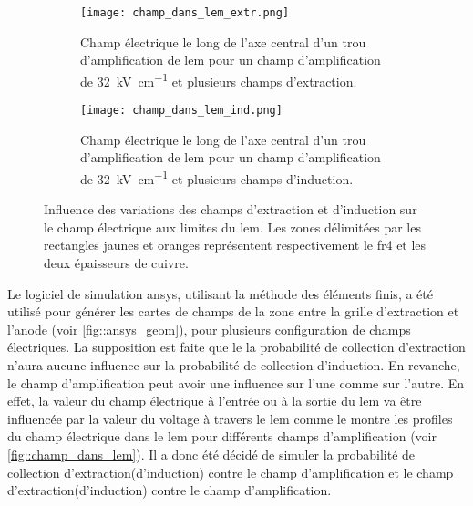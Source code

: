             \begin{figure}[htpb]
                \begin{subfigure}[t]{0.48\textwidth}
                    \texttt{[image: champ\_dans\_lem\_extr.png]}
                    \caption{Champ électrique le long de l'axe central d'un trou d'amplification de \gls{lem} pour un champ d'amplification de \SI{32}{\kilo\volt\per\centi\meter} et plusieurs champs d'extraction.}
                    \label{fig::champ_dans_lem_extr}
                \end{subfigure}
                \hfill
                \begin{subfigure}[t]{0.48\textwidth}
                    \texttt{[image: champ\_dans\_lem\_ind.png]}
                    \caption{Champ électrique le long de l'axe central d'un trou d'amplification de \gls{lem} pour un champ d'amplification de \SI{32}{\kilo\volt\per\centi\meter} et plusieurs champs d'induction.}
                    \label{fig::champ_dans_lem_ind}
                \end{subfigure}
                \caption[Influence des variations des champs d'extraction et d'induction sur le champ électrique aux limites du \gls{lem}.]{Influence des variations des champs d'extraction et d'induction sur le champ électrique aux limites du \gls{lem}. Les zones délimitées par les rectangles jaunes et oranges représentent respectivement le \gls{fr4} et les deux épaisseurs de cuivre.}
                \label{fig::champ_dans_lem}
            \end{figure}
        
            Le logiciel de simulation \gls{ansys}, utilisant la méthode des éléments finis, a été utilisé pour générer les cartes de champs de la zone entre la grille d'extraction et l'anode (voir \autoref{fig::ansys_geom}), pour plusieurs configuration de champs électriques. La supposition est faite que le la probabilité de collection d'extraction n'aura aucune influence sur la probabilité de collection d'induction. En revanche, le champ d'amplification peut avoir une influence sur l'une comme sur l'autre. En effet, la valeur du champ électrique à l'entrée ou à la sortie du \gls{lem} va être influencée par la valeur du voltage à travers le \gls{lem} comme le montre les profiles du champ électrique dans le \gls{lem} pour différents champs d'amplification (voir \autoref{fig::champ_dans_lem}). Il a donc été décidé de simuler la probabilité de collection d'extraction(d'induction) contre le champ d'amplification et le champ d'extraction(d'induction) contre le champ d'amplification.\\
            
